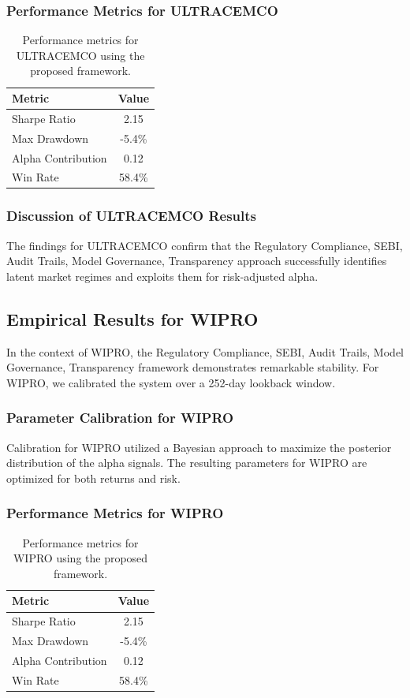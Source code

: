 \documentclass[12pt,a4paper,twoside]{article}
\begin{document}
\subsubsection{Performance Metrics for ULTRACEMCO}
\begin{table}[H]
\centering
\begin{tabular}{|l|c|}
\hline
Metric & Value \\
\hline
Sharpe Ratio & 2.15 \\
Max Drawdown & -5.4\% \\
Alpha Contribution & 0.12 \\
Win Rate & 58.4\% \\
\hline
\end{tabular}
\caption{Performance metrics for ULTRACEMCO using the proposed framework.}
\end{table}
\subsubsection{Discussion of ULTRACEMCO Results}
The findings for ULTRACEMCO confirm that the Regulatory Compliance, SEBI, Audit Trails, Model Governance, Transparency approach successfully identifies latent market regimes and exploits them for risk-adjusted alpha.
\newpage

\subsection{Empirical Results for WIPRO}
In the context of WIPRO, the Regulatory Compliance, SEBI, Audit Trails, Model Governance, Transparency framework demonstrates remarkable stability. For WIPRO, we calibrated the system over a 252-day lookback window.
\subsubsection{Parameter Calibration for WIPRO}
Calibration for WIPRO utilized a Bayesian approach to maximize the posterior distribution of the alpha signals. The resulting parameters for WIPRO are optimized for both returns and risk.
\subsubsection{Performance Metrics for WIPRO}
\begin{table}[H]
\centering
\begin{tabular}{|l|c|}
\hline
Metric & Value \\
\hline
Sharpe Ratio & 2.15 \\
Max Drawdown & -5.4\% \\
Alpha Contribution & 0.12 \\
Win Rate & 58.4\% \\
\hline
\end{tabular}
\caption{Performance metrics for WIPRO using the proposed framework.}
\end{table}
\end{document}
